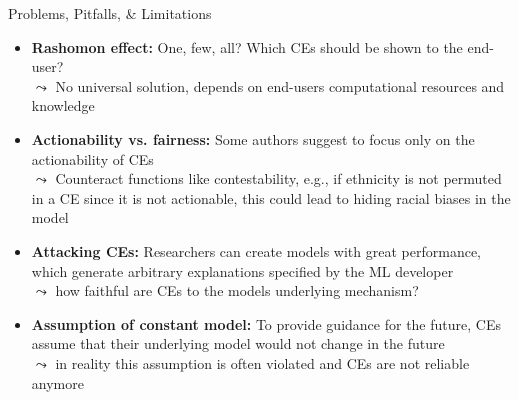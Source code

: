 \documentclass[11pt,compress,t,notes=noshow, aspectratio=169, xcolor=table]{beamer}
\begin{document}
\begin{frame}{Problems, Pitfalls, \& Limitations}
\begin{itemize}[<+->]
    \item \textbf{Rashomon effect:} One, few, all? Which CEs should be shown to the end-user?\\
    $\leadsto$ No universal solution, depends on end-users computational resources and knowledge
    \item \textbf{Actionability vs. fairness:} Some authors suggest to focus only on the actionability of CEs\\
    $\leadsto$ Counteract functions like contestability, e.g., if ethnicity is not permuted in a CE since it is not actionable, this could lead to hiding racial biases in the model
    \item \textbf{Attacking CEs:} Researchers can create models with great performance, which generate arbitrary explanations specified by the ML developer\\
    $\leadsto$ how faithful are CEs to the models underlying mechanism?
    \item \textbf{Assumption of constant model:} To provide guidance for the future, CEs assume that their underlying model would not change in the future\\
    $\leadsto$ in reality this assumption is often violated and CEs are not reliable anymore 
\end{itemize}

\end{frame}

\endlecture
\end{document}
